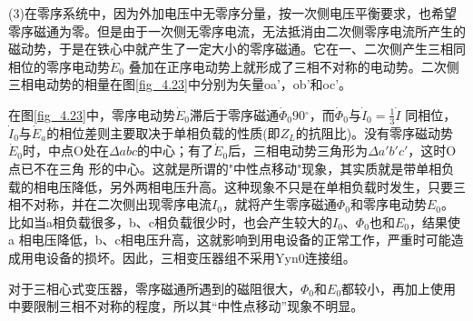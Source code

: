 \documentclass{book}
\begin{document}
(3)在零序系统中，因为外加电压中无零序分量，按一次侧电压平衡要求，也希望零序磁通为零。但是由于一次侧无零序电流，无法抵消由二次侧零序电流所产生的磁动势，于是在铁心中就产生了一定大小的零序磁通。它在一、二次侧产生三相同相位的零序电动势${{\dot{E}}_{0}}$ 叠加在正序电动势上就形成了三相不对称的电动势。二次侧三相电动势的相量在图\ref{fig_4.23}中分别为矢量oa'，ob'和oc'。

在图\ref{fig_4.23}中，零序电动势${{\dot{E}}_{0}}$滞后于零序磁通${{\dot{\Phi }}_{0}}90{}^\circ $，而${{\dot{\Phi }}_{0}}$与${{\dot{I}}_{0}}=\frac{1}{3}\dot{I}$ 同相位，${{\dot{I}}_{0}}$与${{\dot{E}}_{a}}$的相位差则主要取决于单相负载的性质(即${{Z}_{L}}$的抗阻比)。没有零序磁动势${{\dot{E}}_{0}}$时，中点O处在$\Delta abc$的中心；有了${{\dot{E}}_{0}}$后，三相电动势三角形为$\Delta {a}'{b}'{c}'$，这时O点已不在三角 形的中心。这就是所谓的"中性点移动"现象，其实质就是带单相负载的相电压降低，另外两相电压升高。这种现象不只是在单相负载时发生，只要三相不对称，并在二次侧出现零序电流${{I}_{0}}$，就将产生零序磁通${{\Phi}_{0}}$和零序电动势${{E}_{0}}$。比如当a相负载很多，b、c相负载很少时，也会产生较大的${{I}_{0}}$、${{\Phi }_{0}}$也和${{E}_{0}}$，结果使a 相电压降低，b、c相电压升高，这就影响到用电设备的正常工作，严重时可能造成用电设备的损坏。因此，三相变压器组不采用Yyn0连接组。

对于三相心式变压器，零序磁通所遇到的磁阻很大，${{\Phi }_{0}}$和${{E}_{0}}$都较小，再加上使用中要限制三相不对称的程度，所以其“中性点移动”现象不明显。
\end{document}
